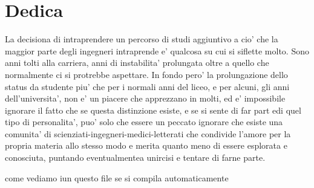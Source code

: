 \documentclass[./dissertation.tex]{subfiles}
\begin{document}
  \chapter*{Dedica}
  La decisiona di intraprendere un percorso di studi aggiuntivo a cio' che la maggior parte degli ingegneri intraprende e' qualcosa su cui si siflette molto. Sono anni tolti alla carriera, anni di instabilita' prolungata oltre a quello che normalmente ci si protrebbe aspettare. In fondo pero' la prolungazione dello status da studente piu' che per i normali anni del liceo, e per alcuni, gli anni dell'universita', non e' un piacere che apprezzano in molti, ed e' impossibile ignorare il fatto che se questa distinzione esiste, e se si sente di far part edi quel tipo di personalita', puo' solo che essere un peccato ignorare che esiste una comunita' di scienziati-ingegneri-medici-letterati che condivide l'amore per la propria materia allo stesso modo e merita quanto meno di essere esplorata e conosciuta, puntando eventualmentea unircisi e tentare di farne parte.


come vediamo iun questo file se si compila automaticamente

  

 
\end{document}
